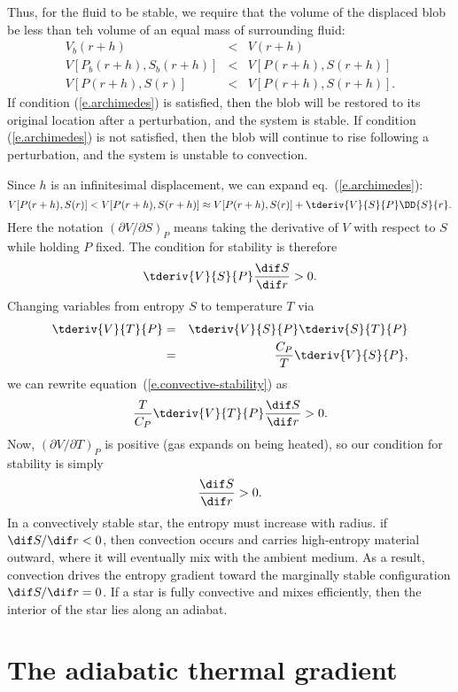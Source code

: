 Thus, for the fluid to be stable, we require that the volume of the displaced blob be less than teh volume of an equal mass of surrounding fluid:
\begin{eqnarray}
V_{b}(r+h) &<& V(r+h) \nonumber\\
V[P_{b}(r+h),S_{b}(r+h)] &<& V[P(r+h),S(r+h)] \nonumber\\
V[P(r+h),S(r)] &<& V[P(r+h),S(r+h)].
\label{e.archimedes}
\end{eqnarray}
If condition (\ref{e.archimedes}) is satisfied, then the blob will be restored to its original location after a perturbation, and the system is stable. If condition (\ref{e.archimedes}) is not satisfied, then the blob will continue to rise following a perturbation, and the system is unstable to convection.

Since $h$ is an infinitesimal displacement, we can expand eq.~(\ref{e.archimedes}):
\[
	V[P(r+h),S(r)] < V[P(r+h),S(r+h)] \approx V[P(r+h),S(r)] + \tderiv{V}{S}{P}\DD{S}{r}.
\]
Here the notation $(\partial V/\partial S)_{P}$ means taking the derivative of $V$ with respect to $S$ while holding $P$ fixed. The condition for stability is therefore
\begin{equation}\label{e.convective-stability}
 \tderiv{V}{S}{P}\frac{\dif S}{\dif r} > 0 .
\end{equation}
Changing variables from entropy $S$ to temperature $T$ via
\begin{eqnarray*}
\tderiv{V}{T}{P} &=& \tderiv{V}{S}{P}\tderiv{S}{T}{P}\\
 &=& \frac{C_{P}}{T}\tderiv{V}{S}{P},
 \end{eqnarray*}
 we can rewrite equation~(\ref{e.convective-stability}) as
 \[
 \frac{T}{C_{P}}\tderiv{V}{T}{P}\frac{\dif S}{\dif r} > 0.
 \]
Now, $(\partial V/\partial T)_{P}$ is positive (gas expands on being heated), so our condition for stability is simply
 \begin{equation}\label{e.entropy-condition}
\frac{\dif S}{\dif r} > 0.
\end{equation}
In a convectively stable star, the entropy must increase with radius. if $\dif S/\dif r < 0$, then convection occurs and carries high-entropy material outward, where it will eventually mix with the ambient medium.  As a result, convection drives the entropy gradient toward the marginally stable configuration $\dif S/\dif r = 0$.  If a star is fully convective and mixes efficiently, then the interior of the star lies along an adiabat. 

\section{The adiabatic thermal gradient}\label{s.adiabatic-gradient}


